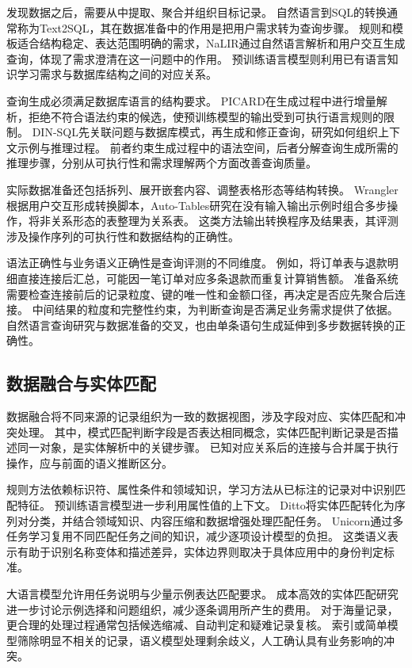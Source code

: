 发现数据之后，需要从中提取、聚合并组织目标记录。
自然语言到SQL的转换通常称为Text2SQL，其在数据准备中的作用是把用户需求转为查询步骤。
规则和模板适合结构稳定、表达范围明确的需求，NaLIR通过自然语言解析和用户交互生成查询，体现了需求澄清在这一问题中的作用。\cite{nalir}
预训练语言模型则利用已有语言知识学习需求与数据库结构之间的对应关系。

查询生成必须满足数据库语言的结构要求。
PICARD在生成过程中进行增量解析，拒绝不符合语法约束的候选，使预训练模型的输出受到可执行语言规则的限制。\cite{picard}
DIN-SQL先关联问题与数据库模式，再生成和修正查询，研究如何组织上下文示例与推理过程。\cite{dinsql}
前者约束生成过程中的语法空间，后者分解查询生成所需的推理步骤，分别从可执行性和需求理解两个方面改善查询质量。

实际数据准备还包括拆列、展开嵌套内容、调整表格形态等结构转换。
Wrangler根据用户交互形成转换脚本，Auto-Tables研究在没有输入输出示例时组合多步操作，将非关系形态的表整理为关系表。\cite{wrangler,autotables}
这类方法输出转换程序及结果表，其评测涉及操作序列的可执行性和数据结构的正确性。

语法正确性与业务语义正确性是查询评测的不同维度。
例如，将订单表与退款明细直接连接后汇总，可能因一笔订单对应多条退款而重复计算销售额。
准备系统需要检查连接前后的记录粒度、键的唯一性和金额口径，再决定是否应先聚合后连接。
中间结果的粒度和完整性约束，为判断查询是否满足业务需求提供了依据。
自然语言查询研究与数据准备的交叉，也由单条语句生成延伸到多步数据转换的正确性。

\subsection{数据融合与实体匹配}

数据融合将不同来源的记录组织为一致的数据视图，涉及字段对应、实体匹配和冲突处理。
其中，模式匹配判断字段是否表达相同概念，实体匹配判断记录是否描述同一对象，是实体解析中的关键步骤。
已知对应关系后的连接与合并属于执行操作，应与前面的语义推断区分。\cite{zh_integration}

规则方法依赖标识符、属性条件和领域知识，学习方法从已标注的记录对中识别匹配特征。
预训练语言模型进一步利用属性值的上下文。
Ditto将实体匹配转化为序列对分类，并结合领域知识、内容压缩和数据增强处理匹配任务。\cite{ditto}
Unicorn通过多任务学习复用不同匹配任务之间的知识，减少逐项设计模型的负担。\cite{unicorn}
这类语义表示有助于识别名称变体和描述差异，实体边界则取决于具体应用中的身份判定标准。

大语言模型允许用任务说明与少量示例表达匹配要求。
成本高效的实体匹配研究进一步讨论示例选择和问题组织，减少逐条调用所产生的费用。\cite{icl_er}
对于海量记录，更合理的处理过程通常包括候选缩减、自动判定和疑难记录复核。
索引或简单模型筛除明显不相关的记录，语义模型处理剩余歧义，人工确认具有业务影响的冲突。

